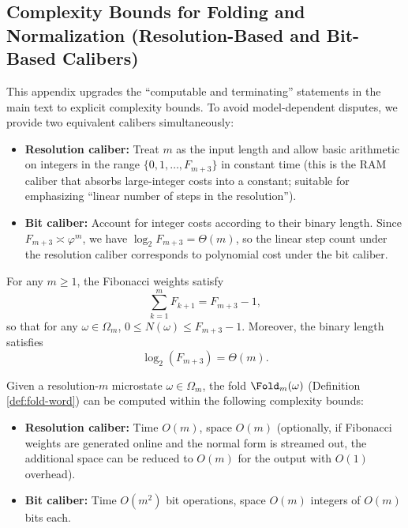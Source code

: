 \subsection{Complexity Bounds for Folding and Normalization (Resolution-Based and Bit-Based Calibers)}
\label{subsec:normalization-complexity-bounds}

This appendix upgrades the ``computable and terminating'' statements in the main text to explicit complexity bounds. To avoid model-dependent disputes, we provide two equivalent calibers simultaneously:
\begin{itemize}
  \item \textbf{Resolution caliber:} Treat $m$ as the input length and allow basic arithmetic on integers in the range $\{0,1,\dots,F_{m+3}\}$ in constant time (this is the RAM caliber that absorbs large-integer costs into a constant; suitable for emphasizing ``linear number of steps in the resolution'').
  \item \textbf{Bit caliber:} Account for integer costs according to their binary length. Since $F_{m+3}\asymp \varphi^{m}$, we have $\log_2 F_{m+3}=\Theta(m)$, so the linear step count under the resolution caliber corresponds to polynomial cost under the bit caliber.
\end{itemize}

\begin{lemma}\label{lem:bitlength-fib}
For any $m\ge 1$, the Fibonacci weights satisfy
\[
\sum_{k=1}^m F_{k+1}=F_{m+3}-1,
\]
so that for any $\omega\in\Omega_m$, $0\le N(\omega)\le F_{m+3}-1$. Moreover, the binary length satisfies
\[
\log_2(F_{m+3})=\Theta(m).
\]
\end{lemma}

\begin{proposition}\label{prop:fold-complexity}
Given a resolution-$m$ microstate $\omega\in\Omega_m$, the fold $\Fold_m(\omega)$ (Definition \ref{def:fold-word}) can be computed within the following complexity bounds:
\begin{itemize}
  \item \textbf{Resolution caliber:} Time $O(m)$, space $O(m)$ (optionally, if Fibonacci weights are generated online and the normal form is streamed out, the additional space can be reduced to $O(m)$ for the output with $O(1)$ overhead).
  \item \textbf{Bit caliber:} Time $O(m^2)$ bit operations, space $O(m)$ integers of $O(m)$ bits each.
\end{itemize}
\end{proposition}

